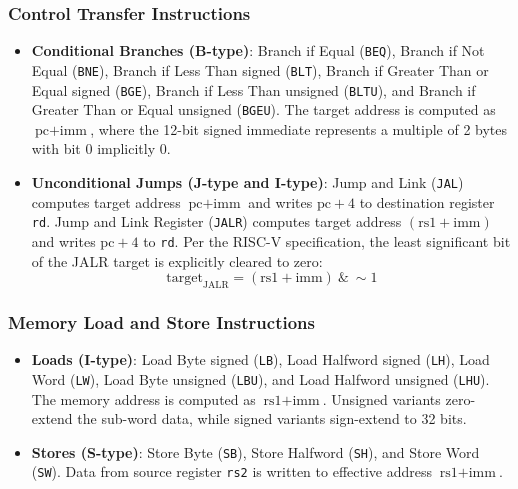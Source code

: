 \subsubsection{Control Transfer Instructions}
\begin{itemize}
    \item \textbf{Conditional Branches (B-type)}: Branch if Equal (\texttt{BEQ}), Branch if Not Equal (\texttt{BNE}), Branch if Less Than signed (\texttt{BLT}), Branch if Greater Than or Equal signed (\texttt{BGE}), Branch if Less Than unsigned (\texttt{BLTU}), and Branch if Greater Than or Equal unsigned (\texttt{BGEU}). The target address is computed as $\text{pc} + \text{imm}$, where the 12-bit signed immediate represents a multiple of 2 bytes with bit 0 implicitly 0.
    \item \textbf{Unconditional Jumps (J-type and I-type)}: Jump and Link (\texttt{JAL}) computes target address $\text{pc} + \text{imm}$ and writes $\text{pc} + 4$ to destination register \texttt{rd}. Jump and Link Register (\texttt{JALR}) computes target address $(\text{rs1} + \text{imm})$ and writes $\text{pc} + 4$ to \texttt{rd}. Per the RISC-V specification, the least significant bit of the JALR target is explicitly cleared to zero:
    \begin{equation}
        \text{target}_{\text{JALR}} = (\text{rs1} + \text{imm}) \ \& \ \sim 1
    \end{equation}
\end{itemize}

\subsubsection{Memory Load and Store Instructions}
\begin{itemize}
    \item \textbf{Loads (I-type)}: Load Byte signed (\texttt{LB}), Load Halfword signed (\texttt{LH}), Load Word (\texttt{LW}), Load Byte unsigned (\texttt{LBU}), and Load Halfword unsigned (\texttt{LHU}). The memory address is computed as $\text{rs1} + \text{imm}$. Unsigned variants zero-extend the sub-word data, while signed variants sign-extend to 32 bits.
    \item \textbf{Stores (S-type)}: Store Byte (\texttt{SB}), Store Halfword (\texttt{SH}), and Store Word (\texttt{SW}). Data from source register \texttt{rs2} is written to effective address $\text{rs1} + \text{imm}$.
\end{itemize}

